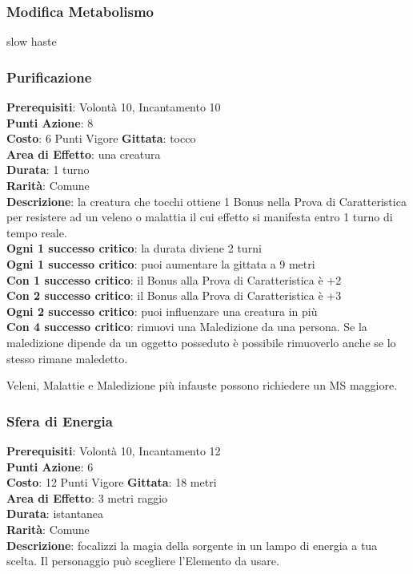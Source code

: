 \documentclass[12pt,a4paper,twoside,openany]{book}
\begin{document}
\begin{multicols}{2}
\subsubsection*{Modifica Metabolismo}
slow haste

\subsubsection*{Purificazione}
\textbf{Prerequisiti}: Volontà 10, Incantamento 10\\
\textbf{Punti Azione}: 8\\
\textbf{Costo}: 6 Punti Vigore
\textbf{Gittata}: tocco \\
\textbf{Area di Effetto}: una creatura\\
\textbf{Durata}: 1 turno\\
\textbf{Rarità}: Comune\\
\textbf{Descrizione}: la creatura che tocchi ottiene 1 Bonus nella Prova di Caratteristica per resistere ad un veleno o malattia il cui effetto si manifesta entro 1 turno di tempo reale.\\
\textbf{Ogni 1 successo critico}: la durata diviene 2 turni\\
\textbf{Ogni 1 successo critico}: puoi aumentare la gittata a 9 metri\\
\textbf{Con 1 successo critico}: il Bonus alla Prova di Caratteristica è +2\\
\textbf{Con 2 successo critico}: il Bonus alla Prova di Caratteristica è +3\\
\textbf{Ogni 2 successo critico}: puoi influenzare una creatura in più\\
\textbf{Con 4 successo critico}: rimuovi una Maledizione da una persona. Se la maledizione dipende da un oggetto posseduto è possibile rimuoverlo anche se lo stesso rimane maledetto. 

Veleni, Malattie e Maledizione più infauste possono richiedere un MS maggiore.

\subsubsection*{Sfera di Energia}
\textbf{Prerequisiti}: Volontà 10, Incantamento 12\\
\textbf{Punti Azione}: 6\\
\textbf{Costo}: 12 Punti Vigore
\textbf{Gittata}: 18 metri\\
\textbf{Area di Effetto}: 3 metri raggio\\
\textbf{Durata}: istantanea\\
\textbf{Rarità}: Comune\\
\textbf{Descrizione}: focalizzi la magia della sorgente in un lampo di energia a tua scelta. Il personaggio può scegliere l'Elemento da usare.


\end{multicols}
\end{document}
